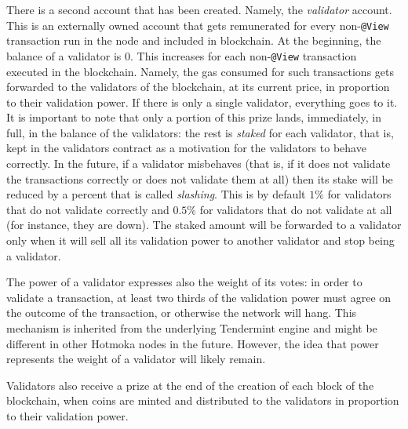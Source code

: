 There is a second account that has been created. Namely, the \emph{validator} account.
This is an externally owned account that gets remunerated for every
non-\texttt{@View}
transaction run in the node and included in blockchain. At
the beginning, the balance of a validator is 0. This increases for each non-\texttt{@View}
transaction executed in the blockchain. Namely, the gas
consumed for such transactions gets forwarded to the validators of the blockchain, at its current price,
in proportion to their validation power.
If there is only a single validator, everything goes to it.
It is important to note that only a portion of this prize lands, immediately, in full,
in the balance of the validators: the rest is \emph{staked}
for each validator, that is, kept in the validators contract
as a motivation for the validators to behave correctly. In the future, if a validator misbehaves
(that is, if it does not validate the transactions correctly or does not validate them at all) then
its stake will be reduced by a percent that is called \emph{slashing}.
This is by default $1\%$ for validators that do not validate correctly and $0.5\%$ for
validators that do not validate at all (for instance, they are down).
The staked amount will be forwarded to a validator only when it will sell all its
validation power to another validator and stop being a validator.

The power of a validator expresses also the weight of its votes: in order to validate a transaction,
at least two thirds of the validation power must agree on the outcome of the transaction, or
otherwise the network will hang.
This mechanism is inherited from the underlying Tendermint engine and might be different
in other Hotmoka nodes in the future. However, the idea that power represents the weight
of a validator will likely remain.

Validators also receive a prize at the end of the creation of each block of the blockchain,
when coins are minted and distributed to the validators in proportion to their validation power.

